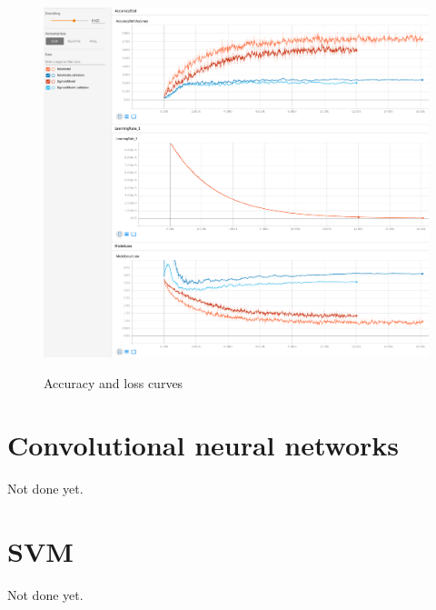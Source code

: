 \documentclass[a4paper]{article}
\begin{document}
\begin{figure}[h]
    \caption[]{Accuracy and loss curves}
    \centering
    \includegraphics[page=2,width=1.0\textwidth]{training.png}
    \label{fig:training}
\end{figure}

\section{Convolutional neural networks}
Not done yet.

\section{SVM}
Not done yet.
\end{document}
